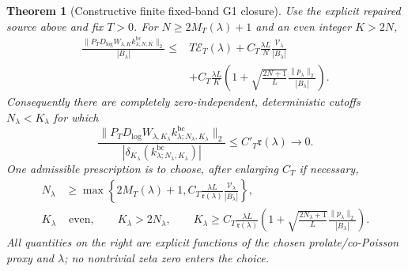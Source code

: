 \documentclass[11pt]{article}
\newtheorem{theorem}{Theorem}[section]
\theoremstyle{remark}
\begin{document}
\begin{theorem}[Constructive finite fixed-band G1 closure]\label{thm:g1-boundary-corrected}
Use the explicit repaired source above and fix $T>0$. For $N\ge2M_T(\lambda)+1$ and an even integer
$K>2N$,
\begin{equation}\label{eq:g1-bc-master}
 \boxed{
 \begin{aligned}
 \frac{\|P_TD_{\log}W_{\lambda,K}
 k^{\mathrm{bc}}_{\lambda;N,K}\|_2}{|B_\lambda|}
 \le{}&T\mathcal E_T(\lambda)
 +C_T\frac{\lambda L}{N}
       \frac{\mathcal V_\lambda}{|B_\lambda|}\\
 &+C_T\frac{\lambda L}{K}
 \left(
 1+\sqrt{\frac{2N+1}{L}}
       \frac{\|p_\lambda\|_2}{|B_\lambda|}
 \right).
 \end{aligned}}
\end{equation}
Consequently there are completely zero-independent, deterministic cutoffs
$N_\lambda<K_\lambda$ for which
\begin{equation}\label{eq:g1-bc-vanishing}
 \boxed{
 \frac{\|P_TD_{\log}W_{\lambda,K_\lambda}
 k^{\mathrm{bc}}_{\lambda;N_\lambda,K_\lambda}\|_2}
 {|\delta_{K_\lambda}(k^{\mathrm{bc}}_{\lambda;N_\lambda,K_\lambda})|}
 \le C'_T\mathfrak r(\lambda)\longrightarrow0.}
\end{equation}
One admissible prescription is to choose, after enlarging $C_T$ if necessary,
\begin{align}
 N_\lambda&\ge
 \max\left\{2M_T(\lambda)+1,
 C_T\frac{\lambda L}{\mathfrak r(\lambda)}
       \frac{\mathcal V_\lambda}{|B_\lambda|}\right\},
 \label{eq:g1-N-explicit}\\
 K_\lambda&\text{ even},\qquad K_\lambda>2N_\lambda,\qquad
 K_\lambda\ge
 C_T\frac{\lambda L}{\mathfrak r(\lambda)}
 \left(1+\sqrt{\frac{2N_\lambda+1}{L}}
       \frac{\|p_\lambda\|_2}{|B_\lambda|}\right).
 \label{eq:g1-K-explicit}
\end{align}
All quantities on the right are explicit functions of the chosen
prolate/co-Poisson proxy and $\lambda$; no nontrivial zeta zero enters the
choice.
\end{theorem}
\end{document}

